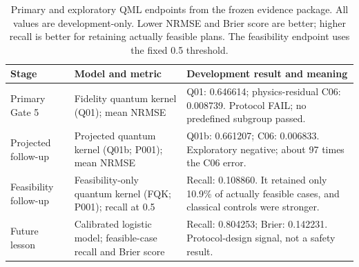 \begin{table}[t]
\caption{Primary and exploratory QML endpoints from the frozen evidence package. All values are development-only. Lower NRMSE and Brier score are better; higher recall is better for retaining actually feasible plans. The feasibility endpoint uses the fixed 0.5 threshold.}
\label{tab:gate5-results}
\centering
\footnotesize
\renewcommand{\arraystretch}{0.94}
\begin{tabularx}{\textwidth}{@{}>{\raggedright\arraybackslash}p{}>{\raggedright\arraybackslash}p{}Y@{}}
\toprule
Stage & Model and metric & Development result and meaning \\
\midrule
Primary Gate 5 & Fidelity quantum kernel (Q01); mean NRMSE & Q01: 0.646614; physics-residual C06: 0.008739. Protocol FAIL; no predefined subgroup passed. \\
Projected follow-up & Projected quantum kernel (Q01b; P001); mean NRMSE & Q01b: 0.661207; C06: 0.006833. Exploratory negative; about 97 times the C06 error. \\
Feasibility follow-up & Feasibility-only quantum kernel (FQK; P001); recall at 0.5 & Recall: 0.108860. It retained only 10.9\% of actually feasible cases, and classical controls were stronger. \\
Future lesson & Calibrated logistic model; feasible-case recall and Brier score & Recall: 0.804253; Brier: 0.142231. Protocol-design signal, not a safety result. \\
\bottomrule
\end{tabularx}
\renewcommand{\arraystretch}{1}
\end{table}
